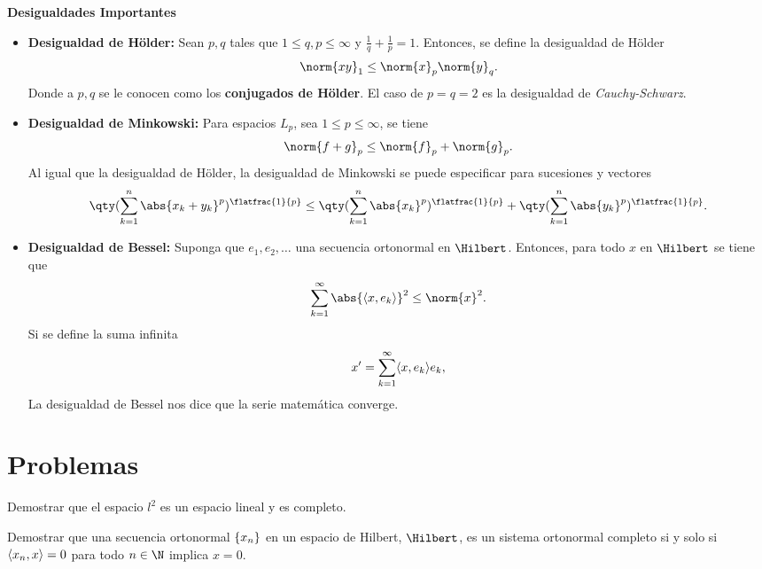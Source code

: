 \begin{mdframed}[style=warning]
	{\large \textbf{Desigualdades Importantes}} \\
	\begin{itemize}
		\item \textbf{Desigualdad de Hölder: } Sean $p,q$ tales que $1 \leq q,p \leq \infty$ y $\frac{1}{q} + \frac{1}{p} = 1$. Entonces, se define la desigualdad de Hölder
			$$ \norm{xy}_1 \leq \norm{x}_p \norm{y}_q .$$
		Donde a $p,q$ se le conocen como los \textbf{conjugados de Hölder}. El caso de $p = q = 2$ es la desigualdad de \textit{Cauchy-Schwarz}. 
		\item \textbf{Desigualdad de Minkowski: } Para espacios $L_p$, sea $1 \leq p \leq \infty$, se tiene
			$$ \norm{f + g}_p \leq \norm{f}_p + \norm{g}_p. $$
		Al igual que la desigualdad de Hölder, la desigualdad de Minkowski se puede especificar para sucesiones y vectores
			$$ \qty(\sum _{k = 1} ^n \abs{x_k + y_k} ^p)^{\flatfrac{1}{p}} \leq \qty(\sum _{k = 1} ^n \abs{x_k} ^p)^{\flatfrac{1}{p}} + \qty(\sum _{k = 1} ^n \abs{y_k} ^p)^{\flatfrac{1}{p}}. $$
		\item \textbf{Desigualdad de Bessel: } Suponga que $e_1 , e_2 , \ldots$ una secuencia ortonormal en $\Hilbert$. Entonces, para todo $x$ en $\Hilbert$ se tiene que
			$$ \sum _{k = 1} ^\infty \abs{\inner{x}{e_k}}^2 \leq \norm{x} ^2. $$
		Si se define la suma infinita
			$$ x^\prime = \sum _{k = 1} ^\infty \langle x , e_k \rangle e_k , $$
		La desigualdad de Bessel nos dice que la serie matemática converge.
	\end{itemize}
\end{mdframed}








\pagebreak


\section*{Problemas}



\begin{ejercicio}
	Demostrar que el espacio $l^2$ es un espacio lineal y es completo.
\end{ejercicio}












\begin{ejercicio}
	Demostrar que una secuencia ortonormal $\{ x_{n} \}$ en un espacio de Hilbert, $\Hilbert$, es un sistema ortonormal completo si y solo si $\langle x_n , x \rangle = 0$ para todo $n \in \N$ implica $x = 0$.
\end{ejercicio}










